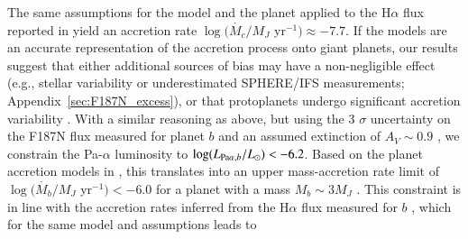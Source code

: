 \documentclass[longauth]{aa}
\begin{document}
The same assumptions for the model and the planet applied to the H$\alpha$ flux reported in
\citet{Haffert2019} %
yield an accretion rate
$\log(\dot{M_c}/M_J$ yr$^{-1}) \approx -7.7$. If the \citet{Aoyama2021} models are an accurate representation of the accretion process onto giant planets, our results suggest that either additional sources of bias may have a non-negligible effect (e.g., stellar variability or underestimated SPHERE/IFS measurements; Appendix~\ref{sec:F187N_excess}), or
that protoplanets undergo significant accretion variability %
\citep[e.g.][]{Szulagyi2020, Casassus2022}. %
With a similar reasoning as above, but using the 3 $\sigma$ uncertainty on the F187N flux measured for planet $b$ and an assumed extinction of $A_V \sim 0.9$ \citep{Uyama2021}, we constrain the Pa-$\alpha$ luminosity to $\log(L_{{\rm Pa}\alpha, b}/L_{\odot}) < -6.2$. %
Based on the planet accretion models in 
\citet{Aoyama2021}, this translates into an %
upper mass-accretion rate limit of %
$\log(\dot{M_b}/M_J$ yr$^{-1}) < -6.0$
for a planet with a mass $M_b \sim 3 M_J$ %
\citep{Wang2021}. %
This constraint is in line with the accretion rates inferred from the H$\alpha$ flux measured for $b$ \citep{Haffert2019}, which for the same model and assumptions leads to %
\end{document}
